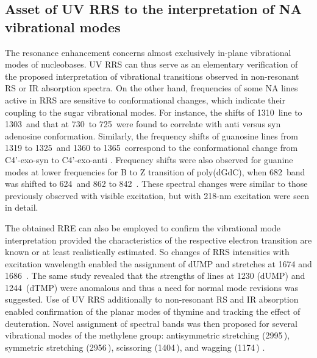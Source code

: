 \subsection{Asset of UV RRS to the interpretation of NA vibrational modes}

The resonance enhancement concerns almost exclusively in-plane vibrational
modes of nucleobases.
UV RRS can thus serve as an elementary verification of the proposed
interpretation of vibrational transitions observed in non-resonant RS or IR
absorption spectra.
On the other hand, frequencies of some NA lines active in RRS are sensitive to
conformational changes, which indicate their coupling to the sugar vibrational
modes.
For instance, the shifts of 1310\,\icm{} line to 1303\,\icm{} and that at
730\,\icm{} to 725\,\icm{} were found to correlate with anti versus syn
adenosine conformation.
Similarly, the frequency shifts of guanosine lines from 1319 to 1325\,\icm{}
and 1360 to 1365\,\icm{} correspond to the conformational change from
C4'-exo-syn to C4'-exo-anti
\parencite{Nishimura1987}.
Frequency shifts were also observed for guanine modes at lower frequencies for
B to Z transition of poly(dGdC), when 682\,\icm{} band was shifted to
624\,\icm{} and 862 to 842\,\icm{}
\parencite{Fodor1986a}.
These spectral changes were similar to those previously observed with visible
excitation, but with 218-nm excitation were seen in detail.

The obtained RRE can also be employed to confirm the vibrational mode
interpretation provided the characteristics of the respective electron
transition are known or at least realistically estimated.
So changes of RRS intensities with excitation wavelength enabled the assignment
of dUMP  and  stretches at 1674 and
1686\,\icm{}
\parencite{Fodor1985}.
The same study revealed that the strengths of lines at 1230 (dUMP) and
1244\,\icm{} (dTMP) were anomalous and thus a need for normal mode revisions
was suggested.
Use of UV RRS additionally to non-resonant RS and IR absorption enabled
confirmation of the planar modes of thymine and tracking the effect of
deuteration.
Novel assignment of spectral bands was then proposed for several vibrational
modes of the methylene group:  antisymmetric stretching
(2995\,\icm{}), symmetric stretching (2956\,\icm{}), scissoring (1404\,\icm{}),
and wagging (1174\,\icm{})
\parencite{Tsuboi1997}.

